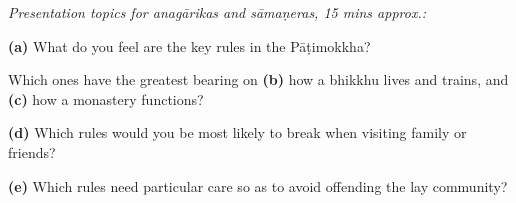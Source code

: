 \documentclass[11pt,oneside]{memoir}
\begin{document}
\vspace*{2\baselineskip}

\textit{Presentation topics for anagārikas and sāmaṇeras, 15 mins approx.:}

\textbf{(a)} What do you feel are the key rules in the Pāṭimokkha?

Which ones have the greatest bearing on \textbf{(b)} how a bhikkhu lives and
trains, and \textbf{(c)} how a monastery functions?

\textbf{(d)} Which rules would you be most likely to break when visiting family
or friends?

\textbf{(e)} Which rules need particular care so as to avoid offending the lay
community?
\end{document}

